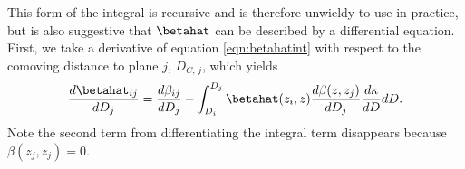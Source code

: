 This form of the integral is recursive and is therefore unwieldy to use in practice, but is also suggestive that $\betahat$ can be described by a differential equation. First, we take a derivative of equation \ref{eqn:betahatint} with respect to the comoving distance to plane $j$, $D_{C, \, j}$, which yields
\begin{equation}
\frac{d\betahat_{i j}}{d D_j} = \frac{d\beta_{i j}}{d D_j} - \int_{D_i}^{D_j} \betahat(z_i, z) \frac{d \beta(z, z_j)}{d D_j} \frac{d \kappa}{d D} d D.
\end{equation}
Note the second term from differentiating the integral term disappears because $\beta(z_j, z_j) = 0$. 
  
  
  
  
  